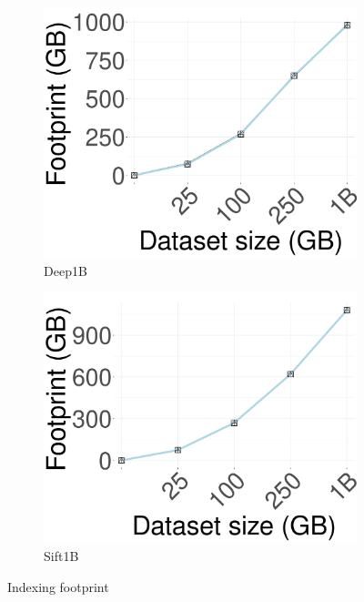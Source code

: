 \begin{figure}[htbp]
            \begin{subfigure}[b]{0.3\textwidth}
            \centering
                \includegraphics[width=\textwidth]{../img/oigas/IDX/idx_footprint_deep_n.png}
                \caption{Deep1B}
        \label{fig:1M_Time}
    \end{subfigure}
    \hspace{0.4cm}
             \begin{subfigure}[b]{0.3\textwidth}
                \includegraphics[width=\textwidth]{../img/oigas/IDX/idx_footprint_sift_n.png}
        \caption{Sift1B}
        \label{fig:1B_Time}
    \end{subfigure}

    \caption{Indexing footprint}
    \label{fig:oigas:idx:time}
\end{figure}

